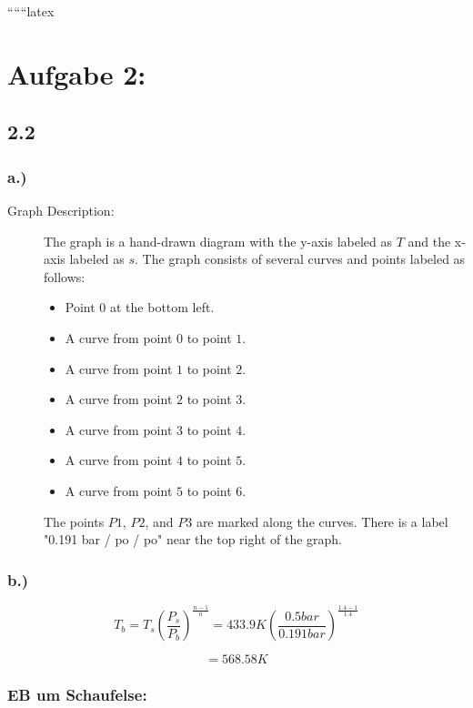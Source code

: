 ``````latex


\section*{Aufgabe 2:}
\subsection*{2.2}

\subsubsection*{a.)}

\begin{description}
    \item[Graph Description:] The graph is a hand-drawn diagram with the y-axis labeled as $T$ and the x-axis labeled as $s$. The graph consists of several curves and points labeled as follows:
    \begin{itemize}
        \item Point $0$ at the bottom left.
        \item A curve from point $0$ to point $1$.
        \item A curve from point $1$ to point $2$.
        \item A curve from point $2$ to point $3$.
        \item A curve from point $3$ to point $4$.
        \item A curve from point $4$ to point $5$.
        \item A curve from point $5$ to point $6$.
    \end{itemize}
    The points $P1$, $P2$, and $P3$ are marked along the curves. There is a label "0.191 bar / po / po" near the top right of the graph.
\end{description}

\subsubsection*{b.)}

\[
T_b = T_s \left( \frac{P_s}{P_b} \right)^{\frac{n-1}{n}} = 433.9K \left( \frac{0.5 bar}{0.191 bar} \right)^{\frac{1.4-1}{1.4}}
\]

\[
= 568.58K
\]

\subsubsection*{EB um Schaufelse:}

